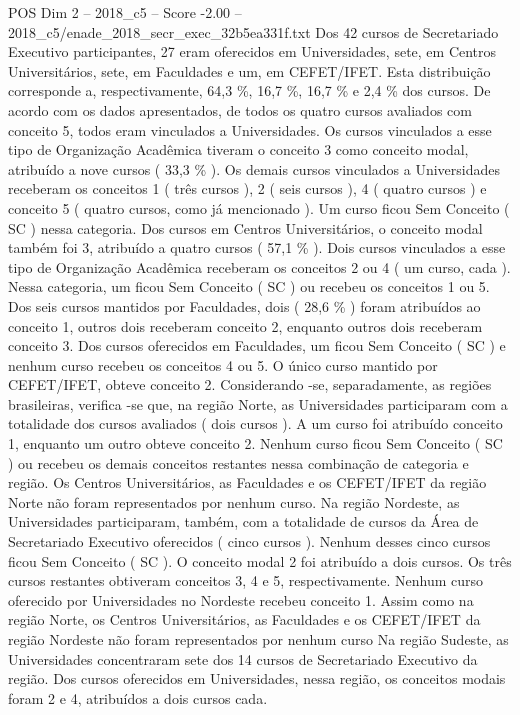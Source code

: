 \begin{textsample}{POS Dim 2 – 2018\_c5 – Score -2.00 – 2018\_c5/enade\_2018\_secr\_exec\_32b5ea331f.txt}
Dos 42 cursos de Secretariado Executivo participantes, 27 eram oferecidos em Universidades, sete, em Centros Universitários, sete, em Faculdades e um, em CEFET/IFET.
Esta distribuição corresponde a, respectivamente, 64,3 \%, 16,7 \%, 16,7 \% e 2,4 \% dos cursos.
De acordo com os dados apresentados, de todos os quatro cursos avaliados com conceito 5, todos eram vinculados a Universidades.
Os cursos vinculados a esse tipo de Organização Acadêmica tiveram o conceito 3 como conceito modal, atribuído a nove cursos ( 33,3 \% ).
Os demais cursos vinculados a Universidades receberam os conceitos 1 ( três cursos ), 2 ( seis cursos ), 4 ( quatro cursos ) e conceito 5 ( quatro cursos, como já mencionado ).
Um curso ficou Sem Conceito ( SC ) nessa categoria.
Dos cursos em Centros Universitários, o conceito modal também foi 3, atribuído a quatro cursos ( 57,1 \% ).
Dois cursos vinculados a esse tipo de Organização Acadêmica receberam os conceitos 2 ou 4 ( um curso, cada ).
Nessa categoria, um ficou Sem Conceito ( SC ) ou recebeu os conceitos 1 ou 5.
Dos seis cursos mantidos por Faculdades, dois ( 28,6 \% ) foram atribuídos ao conceito 1, outros dois receberam conceito 2, enquanto outros dois receberam conceito 3.
Dos cursos oferecidos em Faculdades, um ficou Sem Conceito ( SC ) e nenhum curso recebeu os conceitos 4 ou 5.
O único curso mantido por CEFET/IFET, obteve conceito 2.
Considerando -se, separadamente, as regiões brasileiras, verifica -se que, na região Norte, as Universidades participaram com a totalidade dos cursos avaliados ( dois cursos ).
A um curso foi atribuído conceito 1, enquanto um outro obteve conceito 2.
Nenhum curso ficou Sem Conceito ( SC ) ou recebeu os demais conceitos restantes nessa combinação de categoria e região.
Os Centros Universitários, as Faculdades e os CEFET/IFET da região Norte não foram representados por nenhum curso.
Na região Nordeste, as Universidades participaram, também, com a totalidade de cursos da Área de Secretariado Executivo oferecidos ( cinco cursos ).
Nenhum desses cinco cursos ficou Sem Conceito ( SC ).
O conceito modal 2 foi atribuído a dois cursos.
Os três cursos restantes obtiveram conceitos 3, 4 e 5, respectivamente.
Nenhum curso oferecido por Universidades no Nordeste recebeu conceito 1.
Assim como na região Norte, os Centros Universitários, as Faculdades e os CEFET/IFET da região Nordeste não foram representados por nenhum curso Na região Sudeste, as Universidades concentraram sete dos 14 cursos de Secretariado Executivo da região.
Dos cursos oferecidos em Universidades, nessa região, os conceitos modais foram 2 e 4, atribuídos a dois cursos cada.

\end{textsample}
